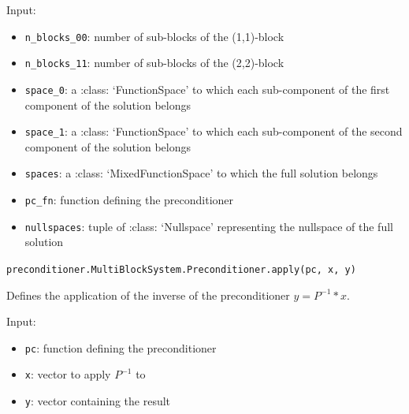 \documentclass[letterpaper,10pt,english]{sphinxmanual}
\begin{document}
Input:
\begin{itemize}
\item \texttt{n{\_}blocks{\_}00}: number of sub-blocks of the (1,1)-block

\item \texttt{n{\_}blocks{\_}11}: number of sub-blocks of the (2,2)-block

\item \texttt{space{\_}0}: a :class: `FunctionSpace' to which each sub-component
                of the first component of the solution belongs

\item \texttt{space{\_}1}: a :class: `FunctionSpace' to which each sub-component
                of the second component of the solution belongs

\item \texttt{spaces}: a :class: `MixedFunctionSpace' to which the full
                solution belongs

\item \texttt{pc{\_}fn}: function defining the preconditioner

\item \texttt{nullspaces}: tuple of :class: `Nullspace' representing the
                nullspace of the full solution
\end{itemize}

\vspace{3ex}

\texttt{preconditioner.MultiBlockSystem.Preconditioner.apply(pc, x, y)}

Defines the application of the inverse of the preconditioner $y = P^{-1} * x$.

Input:
\begin{itemize}
\item \texttt{pc}: function defining the preconditioner

\item \texttt{x}: vector to apply $P^{-1}$ to

\item \texttt{y}: vector containing the result
\end{itemize}




\end{document}
